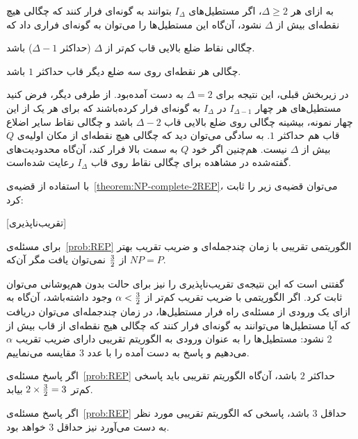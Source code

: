 
به ازای هر $\Delta \geq 2$، اگر مستطیل‌‌های $I_{\Delta}$ بتوانند به گونه‌ای فرار کنند که چگالی هیچ نقطه‌ای بیش از $\Delta$ نشود، آن‌گاه این مستطیل‌ها را می‌توان به گونه‌ای فراری داد که


 چگالی نقاط ضلع بالایی قاب کم‌تر از $\Delta$ (حد‌اکثر $\Delta - 1$) باشد.

 چگالی هر نقطه‌ای روی سه ضلع دیگر قاب حداکثر $1$ باشد.



در زیربخش قبلی، این نتیجه برای $\Delta = 2$ به دست آمده‌بود. از طرفی دیگر، فرض کنید مستطیل‌های هر چهار $I_{\Delta - 1}$ در $I_{\Delta}$ به گونه‌ای فرار کرده‌باشند که برای هر یک از این چهار نمونه، بیشینه چگالی روی ضلع بالایی قاب $\Delta - 2$ باشد و چگالی نقاط سایر اضلاع قاب هم حد‌اکثر $1$.
به سادگی می‌توان دید که چگالی هیچ نقطه‌ای از مکان اولیه‌ی $Q$ بیش از $\Delta$ نیست. هم‌چنین اگر خود $Q$ به سمت بالا فرار کند، آن‌گاه محدودیت‌های گفته‌شده در مشاهده برای چگالی نقاط روی قاب $I_{\Delta}$ رعایت شده‌است.



با استفاده از قضیه‌ی~\ref{theorem:NP-complete-2REP}، می‌توان قضیه‌ی زیر را ثابت کرد:

[تقریب‌نا‌پذیری]

برای مسئله‌ی~\ref{prob:REP} الگوریتمی تقریبی با زمان چند‌جمله‌ای و ضریب تقریب بهتر از ${3} \over {2}$ نمی‌توان یافت مگر آن‌که $NP = P$.



گفتنی است که این نتیجه‌ی تقریب‌ناپذیری را نیز برای حالت بدون هم‌پوشانی می‌توان ثابت کرد. اگر الگوریتمی با ضریب تقریب کم‌تر از $\alpha < {{3} \over {2}}$ وجود داشته‌باشد، آن‌گاه به ازای یک ورودی از مسئله‌ی راه فرار مستطیل‌ها، در زمان چند‌جمله‌ای می‌توان دریافت که آیا مستطیل‌ها می‌توانند به گونه‌ای فرار کنند که چگالی هیج نقطه‌ای از قاب بیش از $2$ نشود: مستطیل‌ها را به عنوان ورودی به الگوریتم تقریبی دارای ضریب تقریب $\alpha$ می‌دهیم و پاسخ به دست آمده را با عدد $3$ مقایسه می‌نماییم.


 اگر پاسخ مسئله‌ی~\ref{prob:REP} حداکثر $2$ باشد، آن‌گاه الگوریتم تقریبی باید پاسخی کم‌تر $2 \times {{3} \over {2}} = 3$ بیابد.

 اگر پاسخ مسئله‌ی~\ref{prob:REP} حداقل $3$ باشد، پاسخی که الگوریتم تقریبی مورد نظر به دست می‌آورد نیز حد‌اقل $3$ خواهد بود.


